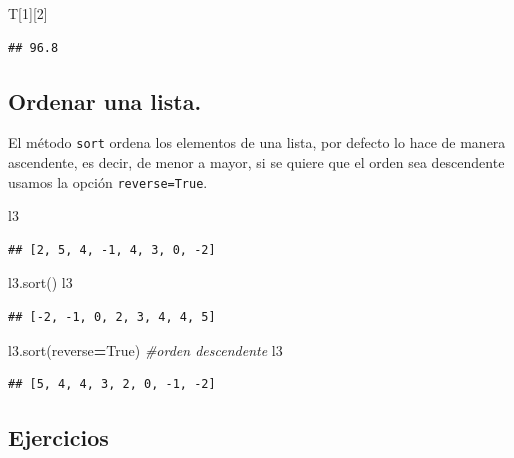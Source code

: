 \documentclass[
]{book}
\newenvironment{Shaded}{\begin{snugshade}}{\end{snugshade}}
\newcommand{\CommentTok}[1]{\textcolor[rgb]{0.56,0.35,0.01}{\textit{#1}}}
\newcommand{\DecValTok}[1]{\textcolor[rgb]{0.00,0.00,0.81}{#1}}
\newcommand{\NormalTok}[1]{#1}
\newcommand{\OperatorTok}[1]{\textcolor[rgb]{0.81,0.36,0.00}{\textbf{#1}}}
\newcommand{\VariableTok}[1]{\textcolor[rgb]{0.00,0.00,0.00}{#1}}
\theoremstyle{definition}
\theoremstyle{definition}
\theoremstyle{definition}
\theoremstyle{definition}
\theoremstyle{remark}
\begin{document}
\begin{Shaded}
\begin{Highlighting}[]
\NormalTok{T[}\DecValTok{1}\NormalTok{][}\DecValTok{2}\NormalTok{]}
\end{Highlighting}
\end{Shaded}

\begin{verbatim}
## 96.8
\end{verbatim}

\hypertarget{ordenar-una-lista.}{%
\subsection{Ordenar una lista.}\label{ordenar-una-lista.}}

El método \texttt{sort} ordena los elementos de una lista, por defecto lo hace de manera ascendente, es decir, de menor a mayor, si se quiere que el orden sea descendente usamos la opción \texttt{reverse=True}.

\begin{Shaded}
\begin{Highlighting}[]
\NormalTok{l3}
\end{Highlighting}
\end{Shaded}

\begin{verbatim}
## [2, 5, 4, -1, 4, 3, 0, -2]
\end{verbatim}

\begin{Shaded}
\begin{Highlighting}[]
\NormalTok{l3.sort()}
\NormalTok{l3}
\end{Highlighting}
\end{Shaded}

\begin{verbatim}
## [-2, -1, 0, 2, 3, 4, 4, 5]
\end{verbatim}

\begin{Shaded}
\begin{Highlighting}[]
\NormalTok{l3.sort(reverse}\OperatorTok{=}\VariableTok{True}\NormalTok{) }\CommentTok{\#orden descendente }
\NormalTok{l3}
\end{Highlighting}
\end{Shaded}

\begin{verbatim}
## [5, 4, 4, 3, 2, 0, -1, -2]
\end{verbatim}

\hypertarget{ejercicios-1}{%
\subsection{Ejercicios}\label{ejercicios-1}}
\end{document}
